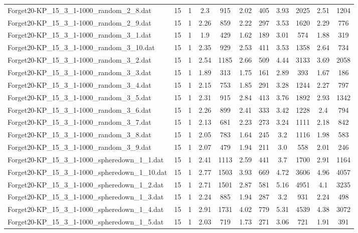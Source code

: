 \begin{table}[!ht]
\begin{tabular}{lcccccccccc}
Forget20-KP\_15\_3\_1-1000\_random\_2\_8.dat & 15 & 1 & 2.3 & 915 & 2.02 & 405 & 3.93 & 2025 & 2.51 & 1204 \\
Forget20-KP\_15\_3\_1-1000\_random\_2\_9.dat & 15 & 1 & 2.26 & 859 & 2.22 & 297 & 3.53 & 1620 & 2.29 & 776 \\
Forget20-KP\_15\_3\_1-1000\_random\_3\_1.dat & 15 & 1 & 1.9 & 429 & 1.62 & 189 & 3.01 & 574 & 1.88 & 319 \\
Forget20-KP\_15\_3\_1-1000\_random\_3\_10.dat & 15 & 1 & 2.35 & 929 & 2.53 & 411 & 3.53 & 1358 & 2.64 & 734 \\
Forget20-KP\_15\_3\_1-1000\_random\_3\_2.dat & 15 & 1 & 2.54 & 1185 & 2.66 & 509 & 4.44 & 3133 & 3.69 & 2058 \\
Forget20-KP\_15\_3\_1-1000\_random\_3\_3.dat & 15 & 1 & 1.89 & 313 & 1.75 & 161 & 2.89 & 393 & 1.67 & 186 \\
Forget20-KP\_15\_3\_1-1000\_random\_3\_4.dat & 15 & 1 & 2.15 & 753 & 1.85 & 291 & 3.28 & 1244 & 2.27 & 797 \\
Forget20-KP\_15\_3\_1-1000\_random\_3\_5.dat & 15 & 1 & 2.31 & 915 & 2.84 & 413 & 3.76 & 1892 & 2.93 & 1342 \\
Forget20-KP\_15\_3\_1-1000\_random\_3\_6.dat & 15 & 1 & 2.26 & 899 & 2.41 & 333 & 3.42 & 1228 & 2.4 & 794 \\
Forget20-KP\_15\_3\_1-1000\_random\_3\_7.dat & 15 & 1 & 2.13 & 681 & 2.23 & 273 & 3.24 & 1111 & 2.18 & 842 \\
Forget20-KP\_15\_3\_1-1000\_random\_3\_8.dat & 15 & 1 & 2.05 & 783 & 1.64 & 245 & 3.2 & 1116 & 1.98 & 583 \\
Forget20-KP\_15\_3\_1-1000\_random\_3\_9.dat & 15 & 1 & 2.07 & 479 & 1.94 & 211 & 3.0 & 558 & 2.01 & 246 \\
Forget20-KP\_15\_3\_1-1000\_spheredown\_1\_1.dat & 15 & 1 & 2.41 & 1113 & 2.59 & 441 & 3.7 & 1700 & 2.91 & 1164 \\
Forget20-KP\_15\_3\_1-1000\_spheredown\_1\_10.dat & 15 & 1 & 2.77 & 1503 & 3.93 & 669 & 4.72 & 3606 & 4.96 & 4057 \\
Forget20-KP\_15\_3\_1-1000\_spheredown\_1\_2.dat & 15 & 1 & 2.71 & 1501 & 2.87 & 581 & 5.16 & 4951 & 4.1 & 3235 \\
Forget20-KP\_15\_3\_1-1000\_spheredown\_1\_3.dat & 15 & 1 & 2.24 & 885 & 1.94 & 287 & 3.2 & 931 & 2.24 & 498 \\
Forget20-KP\_15\_3\_1-1000\_spheredown\_1\_4.dat & 15 & 1 & 2.91 & 1731 & 4.02 & 779 & 5.31 & 4539 & 4.38 & 3072 \\
Forget20-KP\_15\_3\_1-1000\_spheredown\_1\_5.dat & 15 & 1 & 2.03 & 719 & 1.73 & 271 & 3.06 & 721 & 1.91 & 391 \\

\end{tabular}
\end{table}
